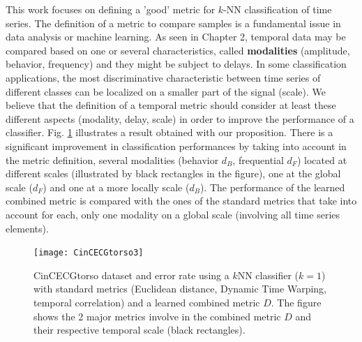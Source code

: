 This work focuses on defining a 'good' metric for $k$-NN classification of time series. The definition of a metric to compare samples is a fundamental issue in data analysis or machine learning. As seen in Chapter 2, temporal data may be compared based on one or several characteristics, called \textbf{modalities} (amplitude, behavior, frequency) and they might be subject to delays. In some classification applications, the most discriminative characteristic between time series of different classes can be localized on a smaller part of the signal (scale). We believe that the definition of a temporal metric should consider at least these different aspects (modality, delay, scale) in order to improve the performance of a classifier. Fig. \ref{fig:SonyAIBO} illustrates a result obtained with our proposition. There is a significant improvement in classification performances by taking into account in the metric definition, several modalities (behavior $d_B$, frequential $d_F$) located at different scales (illustrated by black rectangles in the figure), one at the global scale ($d_F$) and one at a more locally scale ($d_B$). The performance of the learned combined metric is compared with the ones of the standard metrics that take into account for each, only one modality on a global scale (involving all time series elements).  




\begin{figure}[h!]
	\centering
	\texttt{[image: CinCECGtorso3]}
	\caption[CinCECGtorso dataset and error rate using a $k$-NN ($k=1$) with standard metrics (Euclidean distance, Dynamic Time Warping, temporal correlation) and a learned combined metric $D$.]{CinCECGtorso dataset and error rate using a $k$NN classifier ($k=1$) with standard metrics (Euclidean distance, Dynamic Time Warping, temporal correlation) and a learned combined metric $D$. The figure shows the 2 major metrics involve in the combined metric $D$ and their respective temporal scale (black rectangles).}
	\label{fig:SonyAIBO}
\end{figure}


